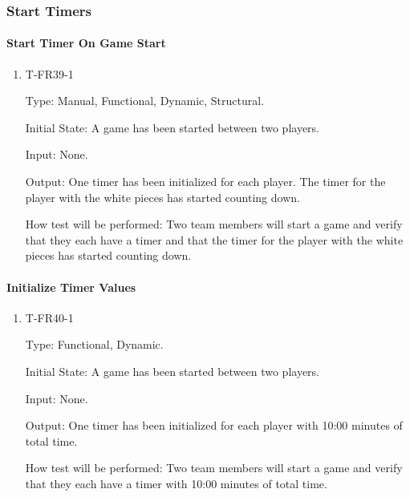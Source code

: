 \documentclass[12pt, titlepage]{article}
\begin{document}
\subsubsection{Start Timers}
		
    \paragraph{Start Timer On Game Start}

        \begin{enumerate}

        \item{T-FR39-1\\}

            Type: Manual, Functional, Dynamic, Structural.
            					
            Initial State: A game has been started between two players.
            					
            Input: None.
            					
            Output: One timer has been initialized for each player. The timer for the player with the white pieces has started counting down.

            How test will be performed: Two team members will start a game and verify that they each have a timer and that the timer for the player with the white pieces has started counting down.

        \end{enumerate}
    
    \paragraph{Initialize Timer Values}

        \begin{enumerate}

        \item{T-FR40-1\\}

            Type: Functional, Dynamic.
            					
            Initial State: A game has been started between two players.
            					
            Input: None.
            					
            Output: One timer has been initialized for each player with 10:00 minutes of total time.

            How test will be performed: Two team members will start a game and verify that they each have a timer with 10:00 minutes of total time.

        \end{enumerate}
        
\end{document}

